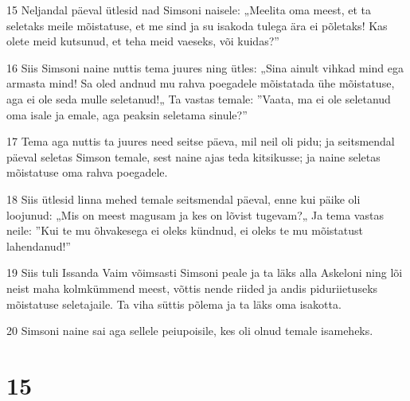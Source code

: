 \par 15 Neljandal päeval ütlesid nad Simsoni naisele: „Meelita oma meest, et ta seletaks meile mõistatuse, et me sind ja su isakoda tulega ära ei põletaks! Kas olete meid kutsunud, et teha meid vaeseks, või kuidas?”
\par 16 Siis Simsoni naine nuttis tema juures ning ütles: „Sina ainult vihkad mind ega armasta mind! Sa oled andnud mu rahva poegadele mõistatada ühe mõistatuse, aga ei ole seda mulle seletanud!„ Ta vastas temale: ”Vaata, ma ei ole seletanud oma isale ja emale, aga peaksin seletama sinule?”
\par 17 Tema aga nuttis ta juures need seitse päeva, mil neil oli pidu; ja seitsmendal päeval seletas Simson temale, sest naine ajas teda kitsikusse; ja naine seletas mõistatuse oma rahva poegadele.
\par 18 Siis ütlesid linna mehed temale seitsmendal päeval, enne kui päike oli loojunud: „Mis on meest magusam ja kes on lõvist tugevam?„ Ja tema vastas neile: ”Kui te mu õhvakesega ei oleks kündnud, ei oleks te mu mõistatust lahendanud!”
\par 19 Siis tuli Issanda Vaim võimsasti Simsoni peale ja ta läks alla Askeloni ning lõi neist maha kolmkümmend meest, võttis nende riided ja andis piduriietuseks mõistatuse seletajaile. Ta viha süttis põlema ja ta läks oma isakotta.
\par 20 Simsoni naine sai aga sellele peiupoisile, kes oli olnud temale isameheks.

\chapter{15}

